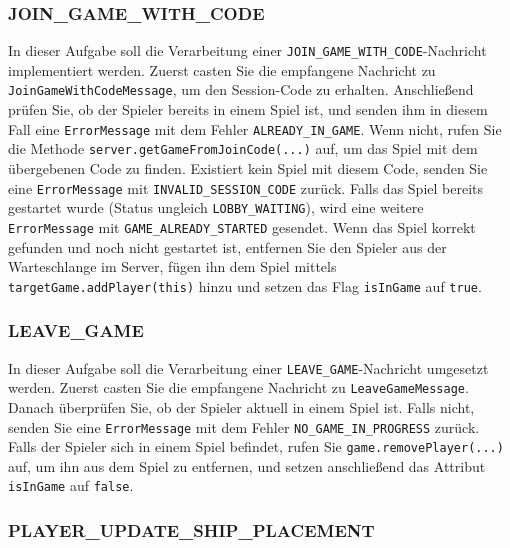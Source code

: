\documentclass[12pt]{article}
\begin{document}
\subsubsection*{JOIN\_GAME\_WITH\_CODE}

In dieser Aufgabe soll die Verarbeitung einer \texttt{JOIN\_GAME\_WITH\_CODE}-Nachricht implementiert werden. 
Zuerst casten Sie die empfangene Nachricht zu \texttt{JoinGameWith\hspace{0pt}CodeMessage}, um den Session-Code zu erhalten. 
Anschließend prüfen Sie, ob der Spieler bereits in einem Spiel ist, und senden ihm in diesem Fall eine \texttt{ErrorMessage} 
mit dem Fehler \texttt{ALREADY\_IN\_GAME}. 
Wenn nicht, rufen Sie die Methode \texttt{server.\hspace{0pt}getGameFromJoinCode(...)} auf, um das Spiel mit dem übergebenen Code zu finden. 
Existiert kein Spiel mit diesem Code, senden Sie eine \texttt{ErrorMessage} mit \texttt{INVALID\_SESSION\_CODE} zurück. 
Falls das Spiel bereits gestartet wurde (Status ungleich \texttt{LOBBY\_WAITING}), 
wird eine weitere \texttt{ErrorMessage} mit \texttt{GAME\_ALREADY\_STARTED} gesendet. 
Wenn das Spiel korrekt gefunden und noch nicht gestartet ist, entfernen Sie den Spieler aus der Warteschlange im Server, 
fügen ihn dem Spiel mittels \texttt{targetGame.addPlayer(this)} hinzu und setzen das Flag \texttt{isInGame} auf \texttt{true}.

\subsubsection*{LEAVE\_GAME}

In dieser Aufgabe soll die Verarbeitung einer \texttt{LEAVE\_GAME}-Nachricht umgesetzt werden. 
Zuerst casten Sie die empfangene Nachricht zu \texttt{LeaveGameMessage}. 
Danach überprüfen Sie, ob der Spieler aktuell in einem Spiel ist. 
Falls nicht, senden Sie eine \texttt{ErrorMessage} mit dem Fehler \texttt{NO\_GAME\_IN\_PROGRESS} zurück. 
Falls der Spieler sich in einem Spiel befindet, rufen Sie \texttt{game.removePlayer(...)} auf, 
um ihn aus dem Spiel zu entfernen, und setzen anschließend das Attribut \texttt{isInGame} auf \texttt{false}.

\subsubsection*{PLAYER\_UPDATE\_SHIP\_PLACEMENT}
\end{document}
